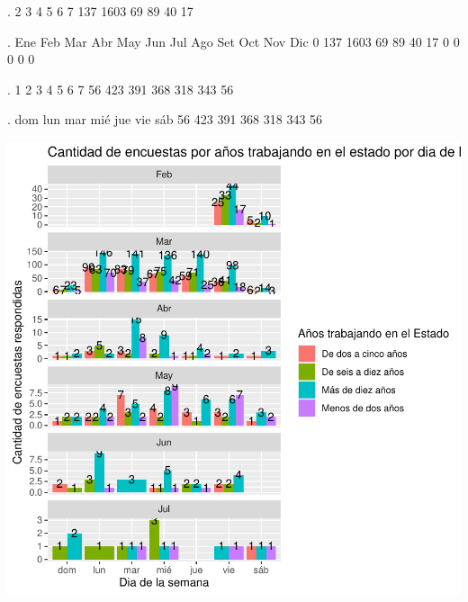 \documentclass{article}
\begin{document}
\begin{Schunk}
\begin{Soutput}
.
   2    3    4    5    6    7 
 137 1603   69   89   40   17 
\end{Soutput}
\begin{Soutput}
.
 Ene  Feb  Mar  Abr  May  Jun  Jul  Ago  Set  Oct  Nov  Dic 
   0  137 1603   69   89   40   17    0    0    0    0    0 
\end{Soutput}
\begin{Soutput}
.
  1   2   3   4   5   6   7 
 56 423 391 368 318 343  56 
\end{Soutput}
\begin{Soutput}
.
dom lun mar mié jue vie sáb 
 56 423 391 368 318 343  56 
\end{Soutput}
\end{Schunk}
\includegraphics{seguimientov4-018}
\end{document}
